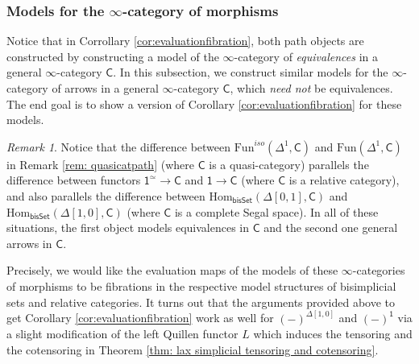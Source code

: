 \documentclass{proc-l}
\theoremstyle{plain}
\theoremstyle{definition}
\theoremstyle{remark}
\newtheorem{remark}[{theorem}]{Remark}
\begin{document}
\subsubsection{Models for the $\infty$-category of morphisms}%
\label{Section:A.4.2}
Notice that in Corrollary \ref{cor:evaluationfibration}, both path objects are constructed by constructing a model of the $\infty$-category of \textit{equivalences} in a general $\infty$-category $\mathsf{C}$. In this subsection, we construct similar models for the $\infty$-category of arrows in a general $\infty$-category $\mathsf{C}$, which \textit{need not} be equivalences. The end goal is to show a version of Corollary \ref{cor:evaluationfibration} for these models.

\begin{remark}%
\label{Remark:A.16}Notice that the difference between $\mathrm{Fun}^{iso}(\Delta^1,\mathsf{C})$  and $\mathrm{Fun}(\Delta^1,\mathsf{C})$ in Remark \ref{rem: quasicatpath} (where $\mathsf{C}$ is a quasi-category) parallels the difference between functors $\mathsf{1}^{\simeq}\rightarrow\mathsf{C}$ and $\mathsf{1}\rightarrow\mathsf{C}$ (where $\mathsf{C}$ is a relative category), and also parallels the difference between $\mathrm{Hom}_{\mathsf{bisSet}}(\Delta[0,1],\mathsf{C})$ and $\mathrm{Hom}_{\mathsf{bisSet}}(\Delta[1,0],\mathsf{C})$ (where $\mathsf{C}$ is a complete Segal space). In all of these situations, the first object models equivalences in $\mathsf{C}$ and the second one general arrows in $\mathsf{C}$.
\end{remark}

Precisely, we would like the evaluation maps of the models of these $\infty$-categories of morphisms to be fibrations in the respective model structures of bisimplicial sets and relative categories. It turns out that the arguments provided above to get Corollary \ref{cor:evaluationfibration} work as well for $(-)^{\Delta[1,0]}$ and $(-)^{\mathsf{1}}$ via a slight modification of the left Quillen functor $L$ which induces the tensoring and the cotensoring in Theorem \ref{thm: lax simplicial tensoring and cotensoring}.
\end{document}
